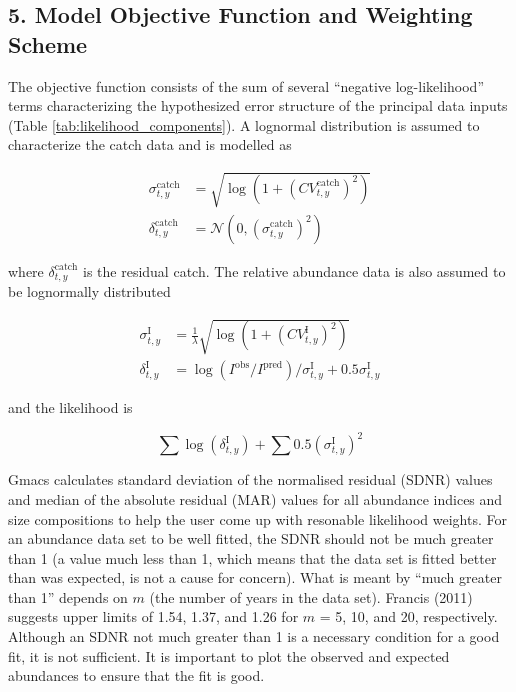 \documentclass[]{article}
\begin{document}
\subsection{5. Model Objective Function and Weighting
Scheme}\label{model-objective-function-and-weighting-scheme}

The objective function consists of the sum of several ``negative
log-likelihood'' terms characterizing the hypothesized error structure
of the principal data inputs (Table \ref{tab:likelihood_components}). A
lognormal distribution is assumed to characterize the catch data and is
modelled as

\begin{align}
  \sigma_{t,y}^\text{catch} &= \sqrt{\log \left( 1 + \left( \mathit{CV}_{t,y}^\text{catch} \right)^2 \right)}\\
  \delta_{t,y}^\text{catch} &= \mathcal{N} \left( 0, \left( \sigma_{t,y}^\text{catch} \right)^2 \right)
\end{align}

where \(\delta_{t,y}^\text{catch}\) is the residual catch. The relative
abundance data is also assumed to be lognormally distributed

\begin{align}
  \sigma_{t,y}^\text{I} &= \frac{1}{\lambda} \sqrt{\log \left( 1 + \left( \mathit{CV}_{t,y}^\text{I} \right)^2 \right)}\\
  \delta_{t,y}^\text{I} &= \log \left( I^\text{obs} / I^\text{pred} \right) / \sigma_{t,y}^\text{I} + 0.5 \sigma_{t,y}^\text{I}
\end{align}

and the likelihood is

\begin{equation}
  \sum \log \left( \delta_{t,y}^\text{I} \right) + \sum 0.5 \left( \sigma_{t,y}^\text{I} \right)^2
\end{equation}

Gmacs calculates standard deviation of the normalised residual (SDNR)
values and median of the absolute residual (MAR) values for all
abundance indices and size compositions to help the user come up with
resonable likelihood weights. For an abundance data set to be well
fitted, the SDNR should not be much greater than 1 (a value much less
than 1, which means that the data set is fitted better than was
expected, is not a cause for concern). What is meant by ``much greater
than 1'' depends on \(m\) (the number of years in the data set). Francis
(2011) suggests upper limits of 1.54, 1.37, and 1.26 for \(m\) = 5, 10,
and 20, respectively. Although an SDNR not much greater than 1 is a
necessary condition for a good fit, it is not sufficient. It is
important to plot the observed and expected abundances to ensure that
the fit is good.
\end{document}
